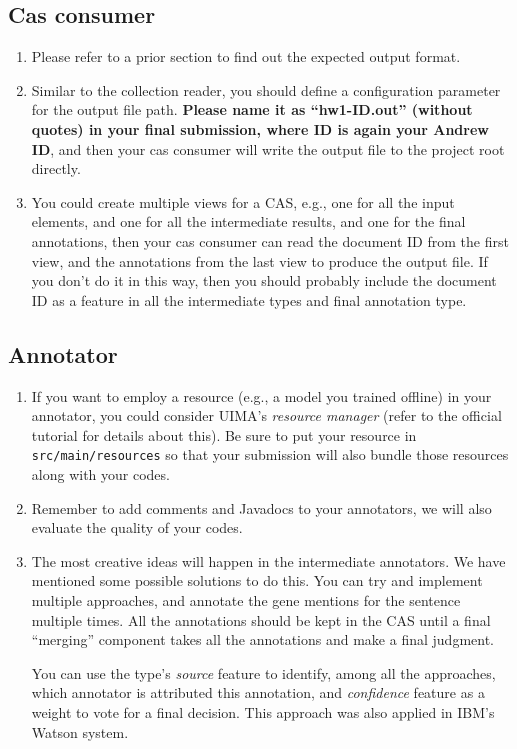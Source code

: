 \subsection{Cas consumer}

\begin{enumerate}
  
\item Please refer to a prior section to find out the expected output format.

\item Similar to the collection reader, you should define a configuration
parameter for the output file path. \textbf{Please name it as ``hw1-ID.out''
(without quotes) in your final submission, where ID is again your Andrew ID},
and then your cas consumer will write the output file to the project root
directly.

\item You could create multiple views for a CAS, e.g., one for all the input
elements, and one for all the intermediate results, and one for the final
annotations, then your cas consumer can read the document ID from the first
view, and the annotations from the last view to produce the output file. If you
don't do it in this way, then you should probably include the document ID as a
feature in all the intermediate types and final annotation type.

\end{enumerate}

\subsection{Annotator}

\begin{enumerate}

\item If you want to employ a resource (e.g., a model you trained offline) in
your annotator, you could consider UIMA's \emph{resource manager} (refer to the
official tutorial for details about this).
Be sure to put your resource in \texttt{src/main/resources} so that your
submission will also bundle those resources along with your codes.

\item Remember to add comments and Javadocs to your annotators, we will also
evaluate the quality of your codes.

\item The most creative ideas will happen in the intermediate annotators. We
have mentioned some possible solutions to do this. You can try and implement
multiple approaches, and annotate the gene mentions for the sentence multiple
times. All the annotations should be kept in the CAS until a final ``merging''
component takes all the annotations and make a final judgment.

You can use the type's \emph{source} feature to identify, among all the
approaches, which annotator is attributed this annotation, and \emph{confidence}
feature as a weight to vote for a final decision. This approach was also applied
in IBM's Watson system.

\end{enumerate}
